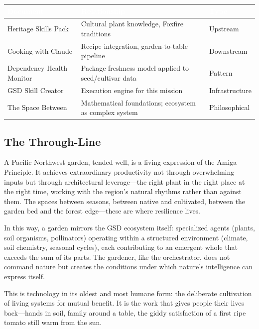\documentclass[11pt,letterpaper]{article}
\newcommand{\tableheader}[1]{\textbf{\sffamily\textcolor{white}{#1}}}
\begin{document}
\begin{center}
\begin{tabularx}{\textwidth}{L{4cm}XC{2.5cm}}
\toprule
{}
\tableheader{Document} & \tableheader{Relationship} & \tableheader{Type} \\
\midrule
Heritage Skills Pack & Cultural plant knowledge, Foxfire traditions & Upstream \\
Cooking with Claude & Recipe integration, garden-to-table pipeline & Downstream \\
Dependency Health Monitor & Package freshness model applied to seed/cultivar data & Pattern \\
GSD Skill Creator & Execution engine for this mission & Infrastructure \\
The Space Between & Mathematical foundations; ecosystem as complex system & Philosophical \\
\bottomrule
\end{tabularx}
\end{center}

\subsection{The Through-Line}

A Pacific Northwest garden, tended well, is a living expression of the Amiga Principle. It achieves extraordinary productivity not through overwhelming inputs but through architectural leverage---the right plant in the right place at the right time, working with the region's natural rhythms rather than against them. The spaces between seasons, between native and cultivated, between the garden bed and the forest edge---these are where resilience lives.

In this way, a garden mirrors the GSD ecosystem itself: specialized agents (plants, soil organisms, pollinators) operating within a structured environment (climate, soil chemistry, seasonal cycles), each contributing to an emergent whole that exceeds the sum of its parts. The gardener, like the orchestrator, does not command nature but creates the conditions under which nature's intelligence can express itself.

This is technology in its oldest and most humane form: the deliberate cultivation of living systems for mutual benefit. It is the work that gives people their lives back---hands in soil, family around a table, the giddy satisfaction of a first ripe tomato still warm from the sun.
\end{document}
